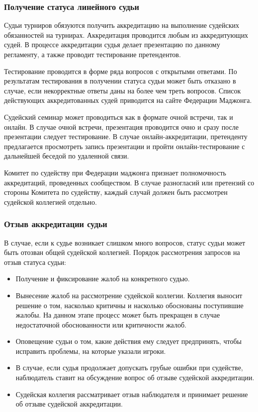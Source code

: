 \subsubsection{Получение статуса линейного судьи}

Судьи турниров обязуются получить аккредитацию на выполнение судейских обязанностей на турнирах. Аккредитация проводится любым из аккредитующих судей. В процессе аккредитации судья делает презентацию по данному регламенту, а также проводит тестирование претендентов.

Тестирование проводится в форме ряда вопросов с открытыми ответами. По результатам тестирования в получении статуса судьи может быть отказано в случае, если некорректные ответы даны на более чем треть вопросов. Список действующих аккредитованных судей приводится на сайте Федерации Маджонга.

Судейский семинар может проводиться как в формате очной встречи, так и онлайн. В случае очной встречи, презентация проводится очно и сразу после презентации следует тестирование. В случае онлайн-аккредитации, претенденту предлагается просмотреть запись презентации и пройти онлайн-тестирование с дальнейшей беседой по удаленной связи.

Комитет по судейству при Федерации маджонга признает полномочность аккредитаций, проведенных сообществом. В случае разногласий или претензий со стороны Комитета по судейству, каждый случай должен быть рассмотрен судейской коллегией отдельно.

\subsubsection{Отзыв аккредитации судьи}

В случае, если к судье возникает слишком много вопросов, статус судьи может быть отозван общей судейской коллегией. Порядок рассмотрения запросов на отзыв статуса судьи:

\begin{itemize}
	\item Получение и фиксирование жалоб на конкретного судью.
	\item Вынесение жалоб на рассмотрение судейской коллегии. Коллегия выносит решение о том, насколько критичны и насколько обоснованы поступившие жалобы. На данном этапе процесс может быть прекращен в случае недостаточной обоснованности или критичности жалоб.
	\item Оповещение судьи о том, какие действия ему следует предпринять, чтобы исправить проблемы, на которые указали игроки.
	\item В случае, если судья продолжает допускать грубые ошибки при судействе, наблюдатель ставит на обсуждение вопрос об отзыве судейской аккредитации.
	\item Судейская коллегия рассматривает отзыв наблюдателя и принимает решение об отзыве судейской аккредитации.
\end{itemize}

